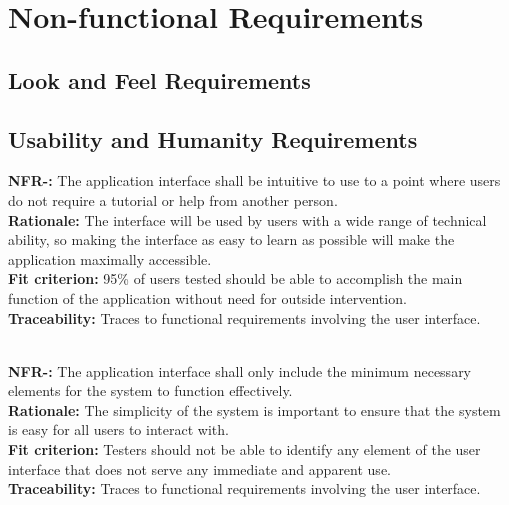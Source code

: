 \documentclass[12pt, titlepage]{article}
\newcounter{NFR_Counter}
\newcounter{FR_Counter}
\begin{document}
\section{Non-functional Requirements}

\subsection{Look and Feel Requirements}

\subsection{Usability and Humanity Requirements}

\textbf{NFR-\the\value{NFR_Counter}:}
The application interface shall be intuitive to use to a point where users do not require a tutorial or help from another person. \\
\textbf{Rationale:}
The interface will be used by users with a wide range of technical ability, so making the interface as easy to learn as possible will make the application maximally accessible. \\
\textbf{Fit criterion:}
95\% of users tested should be able to accomplish the main function of the application without need for outside intervention. \\
\textbf{Traceability:}
Traces to functional requirements involving the user interface. \\~\\
\addtocounter{NFR_Counter}{1}

\noindent\textbf{NFR-\the\value{NFR_Counter}:}
The application interface shall only include the minimum necessary elements for the system to function effectively. \\
\textbf{Rationale:}
The simplicity of the system is important to ensure that the system is easy for all users to interact with. \\
\textbf{Fit criterion:}
Testers should not be able to identify any element of the user interface that does not serve any immediate and apparent use. \\
\textbf{Traceability:}
Traces to functional requirements involving the user interface. \\~\\
\addtocounter{NFR_Counter}{1}
\end{document}
